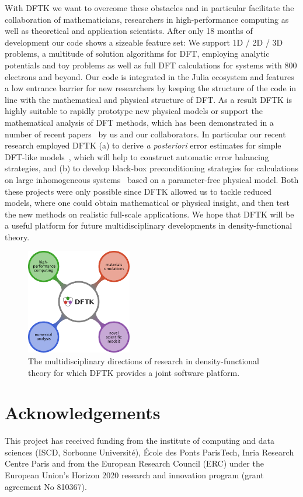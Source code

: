 \documentclass{juliacon}
\begin{document}
With DFTK we want to overcome these obstacles and in particular
facilitate the collaboration
of mathematicians, researchers in high-performance computing
as well as theoretical and application scientists.
After only 18 months of development our code
shows a sizeable feature set:
We support 1D / 2D / 3D problems, a multitude of solution algorithms for DFT,
employing analytic potentials and toy problems as well as
full DFT calculations for systems with 800 electrons and beyond.
Our code is integrated in the Julia ecosystem
and features a low entrance barrier for new researchers
by keeping the structure of the code in line with the
mathematical and physical structure of DFT.
As a result DFTK is highly suitable to rapidly prototype
new physical models or support the mathematical analysis of DFT methods,
which has been demonstrated in a number
of recent papers~\cite{scfanalysis,garrigue2021building,scfprecondition,scferror}
by us and our collaborators.
In particular our recent research employed DFTK
(a) to derive \textit{a posteriori} error estimates for simple DFT-like models~\cite{scferror},
which will help to construct automatic error balancing strategies,
and (b) to develop black-box preconditioning strategies
for calculations on large inhomogeneous systems~\cite{scfprecondition}
based on a parameter-free physical model.
Both these projects were only possible since DFTK allowed us to tackle
reduced models, where one could obtain mathematical or physical insight,
and then test the new methods on realistic full-scale applications.
We hope that DFTK will be a useful platform
for future multidisciplinary developments in density-functional theory.
\vskip 6pt

\begin{figure}[t]
    \centerline{\includegraphics[width=4.6cm]{dftk.pdf}}
    \caption{The multidisciplinary
        directions of research in density-functional theory
        for which DFTK provides a joint software platform.}
    \label{fig:logodftk}
\end{figure}
\section{Acknowledgements} This project has received funding from the institute of
computing and data sciences (ISCD, Sorbonne Université), École des Ponts
ParisTech, Inria Research Centre Paris and from the European Research Council
(ERC) under the European Union's Horizon 2020 research and innovation program
(grant agreement No 810367).




\end{document}
